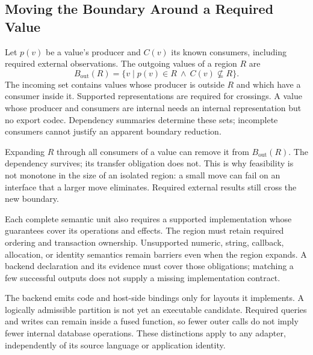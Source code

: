 \documentclass[acmsmall,screen,review,anonymous]{acmart}
\begin{document}
\subsection{Moving the Boundary Around a Required Value}
Let $p(v)$ be a value's producer and $C(v)$ its known consumers, including
required external observations. The outgoing values of a region $R$ are
\begin{equation}
 B_{\mathrm{out}}(R)=
 \{v\mid p(v)\in R\ \land\ C(v)\nsubseteq R\}.
 \label{eq:boundary}
\end{equation}
The incoming set contains values whose producer is outside $R$ and which have
a consumer inside it. Supported representations are required for crossings.
A value whose producer and consumers are internal needs an internal
representation but no export codec. Dependency summaries determine these sets;
incomplete consumers cannot justify an apparent boundary reduction.

Expanding $R$ through all consumers of a value can remove it from
$B_{\mathrm{out}}(R)$. The dependency survives; its transfer obligation does not.
This is why feasibility is not monotone in the size of an isolated region:
a small move can fail on an interface that a larger move eliminates.
Required external results still cross the new boundary.

Each complete semantic unit also requires a supported implementation whose
guarantees cover its operations and effects. The region must retain required
ordering and transaction ownership. Unsupported numeric, string, callback,
allocation, or identity semantics remain barriers even when the region expands.
A backend declaration and its evidence must cover those obligations; matching
a few successful outputs does not supply a missing implementation contract.

The backend emits code and host-side bindings only for layouts it implements.
A logically admissible partition is not yet an executable candidate. Required
queries and writes can remain inside a fused function, so fewer outer calls
do not imply fewer internal database operations. These distinctions apply to
any adapter, independently of its source language or application identity.
\end{document}
